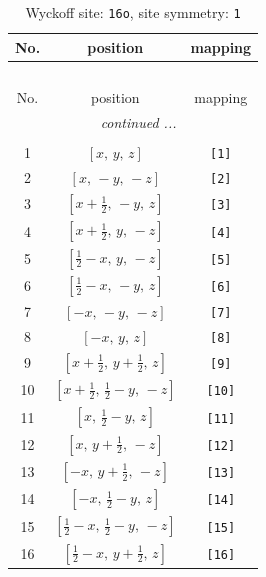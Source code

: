 \documentclass[fleqn,8pt]{jsarticle}
\begin{document}
\begin{longtable}{ccc}
\caption{Wyckoff site: {\tt 16o}, site symmetry: {\tt 1}}
 \\
 \hline \hline
No. & position & mapping \\ \hline \endfirsthead

\multicolumn{2}{l}{\tablename\ \thetable{}} \\
 \hline \hline
No. & position & mapping \\ \hline \endhead

 \hline \hline
\multicolumn{2}{r}{\footnotesize\it continued ...} \\ \endfoot

 \hline \hline
\multicolumn{2}{r}{} \\ \endlastfoot

1 & $\left[ x,\, y,\, z \right]$ & {\tt [1]} \\ \hline
2 & $\left[ x,\, - y,\, - z \right]$ & {\tt [2]} \\ \hline
3 & $\left[ x + \frac{1}{2},\, - y,\, z \right]$ & {\tt [3]} \\ \hline
4 & $\left[ x + \frac{1}{2},\, y,\, - z \right]$ & {\tt [4]} \\ \hline
5 & $\left[ \frac{1}{2} - x,\, y,\, - z \right]$ & {\tt [5]} \\ \hline
6 & $\left[ \frac{1}{2} - x,\, - y,\, z \right]$ & {\tt [6]} \\ \hline
7 & $\left[ - x,\, - y,\, - z \right]$ & {\tt [7]} \\ \hline
8 & $\left[ - x,\, y,\, z \right]$ & {\tt [8]} \\ \hline
9 & $\left[ x + \frac{1}{2},\, y + \frac{1}{2},\, z \right]$ & {\tt [9]} \\ \hline
10 & $\left[ x + \frac{1}{2},\, \frac{1}{2} - y,\, - z \right]$ & {\tt [10]} \\ \hline
11 & $\left[ x,\, \frac{1}{2} - y,\, z \right]$ & {\tt [11]} \\ \hline
12 & $\left[ x,\, y + \frac{1}{2},\, - z \right]$ & {\tt [12]} \\ \hline
13 & $\left[ - x,\, y + \frac{1}{2},\, - z \right]$ & {\tt [13]} \\ \hline
14 & $\left[ - x,\, \frac{1}{2} - y,\, z \right]$ & {\tt [14]} \\ \hline
15 & $\left[ \frac{1}{2} - x,\, \frac{1}{2} - y,\, - z \right]$ & {\tt [15]} \\ \hline
16 & $\left[ \frac{1}{2} - x,\, y + \frac{1}{2},\, z \right]$ & {\tt [16]} \\
\end{longtable}
\end{document}
